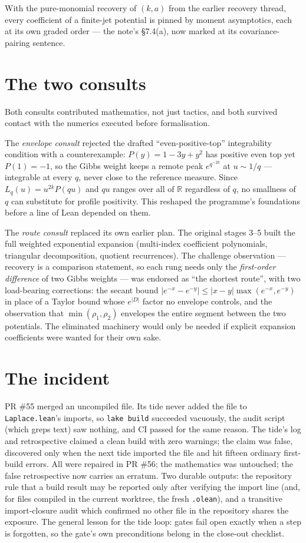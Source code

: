\documentclass[11pt]{article}
\begin{document}
With the pure-monomial recovery of $(k, a)$ from the earlier recovery
thread, every coefficient of a finite-jet potential is pinned by
moment asymptotics, each at its own graded order --- the note's
\S7.4(a), now marked at its covariance-pairing sentence.

\section{The two consults}

Both consults contributed mathematics, not just tactics, and both
survived contact with the numerics executed before formalisation.

The \emph{envelope consult} rejected the drafted
``even-positive-top'' integrability condition with a counterexample:
$P(y) = 1 - 3y + y^2$ has positive even top yet $P(1) = -1$, so the
Gibbs weight keeps a remote peak $e^{q^{-2k}}$ at $u \sim 1/q$ ---
integrable at every $q$, never close to the reference measure. Since
$L_q(u) = u^{2k}P(qu)$ and $qu$ ranges over all of $\mathbb{R}$
regardless of $q$, no smallness of $q$ can substitute for profile
positivity. This reshaped the programme's foundations before a line
of Lean depended on them.

The \emph{route consult} replaced its own earlier plan. The original
stages 3--5 built the full weighted exponential expansion
(multi-index coefficient polynomials, triangular decomposition,
quotient recurrences). The challenge observation --- recovery is a
comparison statement, so each rung needs only the \emph{first-order
difference} of two Gibbs weights --- was endorsed as ``the shortest
route'', with two load-bearing corrections: the secant bound
$|e^{-x} - e^{-y}| \le |x-y|\max(e^{-x}, e^{-y})$ in place of a
Taylor bound whose $e^{|D|}$ factor no envelope controls, and the
observation that $\min(\rho_1, \rho_2)$ envelopes the entire segment
between the two potentials. The eliminated machinery would only be
needed if explicit expansion coefficients were wanted for their own
sake.

\section{The incident}

PR \#55 merged an uncompiled file. Its tide never added the file to
\texttt{Laplace.lean}'s imports, so \texttt{lake build} succeeded
vacuously, the audit script (which greps text) saw nothing, and CI
passed for the same reason. The tide's log and retrospective claimed
a clean build with zero warnings; the claim was false, discovered
only when the next tide imported the file and hit fifteen ordinary
first-build errors. All were repaired in PR \#56; the mathematics was
untouched; the false retrospective now carries an erratum. Two
durable outputs: the repository rule that a build result may be
reported only after verifying the import line (and, for files
compiled in the current worktree, the fresh \texttt{.olean}), and a
transitive import-closure audit which confirmed no other file in the
repository shares the exposure. The general lesson for the tide
loop: gates fail open exactly when a step is forgotten, so the gate's
own preconditions belong in the close-out checklist.
\end{document}
